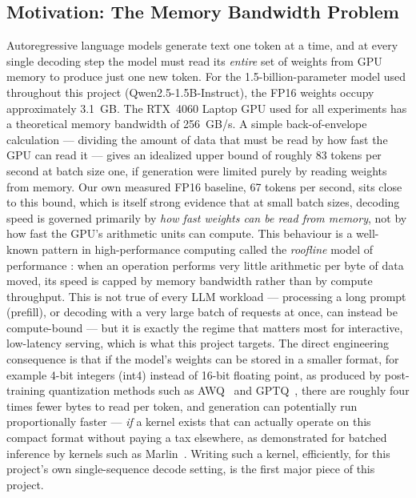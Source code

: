 \documentclass[11pt,a4paper]{article}
\begin{document}
\subsection{Motivation: The Memory Bandwidth Problem}
Autoregressive language models generate text one token at a time, and at every single decoding step the model must
read its \emph{entire} set of weights from GPU memory to produce just one new token. For the 1.5-billion-parameter
model used throughout this project (Qwen2.5-1.5B-Instruct), the FP16 weights occupy approximately 3.1~GB. The RTX~4060
Laptop GPU used for all experiments has a theoretical memory bandwidth of 256~GB/s. A simple back-of-envelope
calculation --- dividing the amount of data that must be read by how fast the GPU can read it --- gives an idealized
upper bound of roughly 83 tokens per second at batch size one, if generation were limited purely by reading weights
from memory. Our own measured FP16 baseline, 67 tokens per second, sits close to this bound, which is itself strong
evidence that at small batch sizes, decoding speed is governed primarily by \emph{how fast weights can be read from
memory}, not by how fast the GPU's arithmetic units can compute. This behaviour is a well-known pattern in
high-performance computing called the \emph{roofline} model of performance \cite{roofline}: when an operation performs
very little arithmetic per byte of data moved, its speed is capped by memory bandwidth rather than by compute
throughput. This is not true of every LLM workload --- processing a long prompt (prefill), or decoding with a very
large batch of requests at once, can instead be compute-bound --- but it is exactly the regime that matters most for
interactive, low-latency serving, which is what this project targets. The direct engineering consequence is that if
the model's weights can be stored in a smaller format, for example 4-bit integers (int4) instead of 16-bit floating
point, as produced by post-training quantization methods such as AWQ~\cite{awq} and GPTQ~\cite{gptq}, there are
roughly four times fewer bytes to read per token, and generation can potentially run proportionally faster ---
\emph{if} a kernel exists that can actually operate on this compact format without paying a tax elsewhere, as
demonstrated for batched inference by kernels such as Marlin~\cite{marlin}. Writing such a kernel, efficiently, for
this project's own single-sequence decode setting, is the first major piece of this project.
\end{document}
